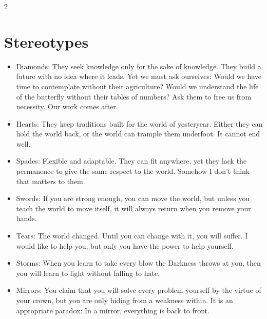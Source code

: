 \begin{multicols}{2}
\section*{Stereotypes}
\begin{itemize}
\item Diamonds: They seek knowledge only for the sake of knowledge. They build a future with no idea where it leads. Yet we must ask ourselves: Would we have time to contemplate without their agriculture? Would we understand the life of the butterfly without their tables of numbers? Ask them to free us from necessity. Our work comes after.
\item Hearts: They keep traditions built for the world of yesteryear. Either they can hold the world back, or the world can trample them underfoot. It cannot end well.
\item Spades: Flexible and adaptable. They can fit anywhere, yet they lack the permanence to give the same respect to the world. Somehow I don't think that matters to them.
\item Swords: If you are strong enough, you can move the world, but unless you teach the world to move itself, it will always return when you remove your hands.

\item Tears: The world changed. Until you can change with it, you will suffer. I would like to help you, but only you have the power to help yourself. 
\item Storms: When you learn to take every blow the Darkness throws at you, then you will learn to fight without falling to hate. 
\item Mirrors: You claim that you will solve every problem yourself by the virtue of your crown, but you are only hiding from a weakness within. It is an appropriate paradox: In a mirror, everything is back to front.  


\end{itemize}
\end{multicols}
